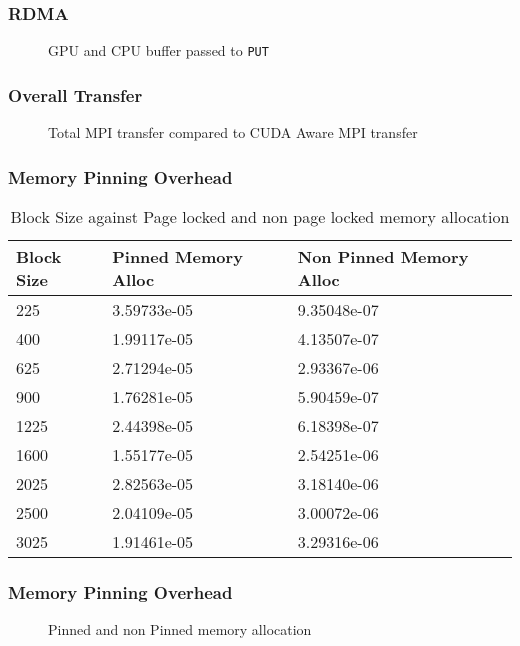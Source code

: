 \documentclass{beamer}
\begin{document}
\begin{frame}[fragile]
  \frametitle{RDMA}
  \begin{figure}[h]
    \resizebox{.9\linewidth}{!}{}
    \caption{GPU and CPU buffer passed to \texttt{PUT}}
  \end{figure}
\end{frame}

\begin{frame}[fragile]
  \frametitle{Overall Transfer}
  \begin{figure}[h]
    \resizebox{.9\linewidth}{!}{}
    \caption{Total MPI transfer compared to CUDA Aware MPI transfer}
  \end{figure}
\end{frame}
\begin{frame}[fragile]
  \frametitle{Memory Pinning Overhead}
  \begin{table}[h]
    \centering
    \begin{tabular}{l<{\onslide<2->} l<{\onslide<3->} l<{\onslide}}
      \hline
      Block Size & Pinned Memory Alloc & Non Pinned Memory Alloc \\
      \hline
      225        & 3.59733e-05         & 9.35048e-07             \\
      400        & 1.99117e-05         & 4.13507e-07             \\
      625        & 2.71294e-05         & 2.93367e-06             \\
      900        & 1.76281e-05         & 5.90459e-07             \\
      1225       & 2.44398e-05         & 6.18398e-07             \\
      1600       & 1.55177e-05         & 2.54251e-06             \\
      2025       & 2.82563e-05         & 3.18140e-06             \\
      2500       & 2.04109e-05         & 3.00072e-06             \\
      3025       & 1.91461e-05         & 3.29316e-06             \\
      \hline
    \end{tabular}
    \caption{Block Size against Page locked and non page locked memory allocation}
  \end{table}
\end{frame}

\begin{frame}[fragile]
  \frametitle{Memory Pinning Overhead}
  \begin{figure}[h]
    \resizebox{.9\linewidth}{!}{}
    \caption{Pinned and non Pinned memory allocation}
  \end{figure}
\end{frame}
\end{document}
